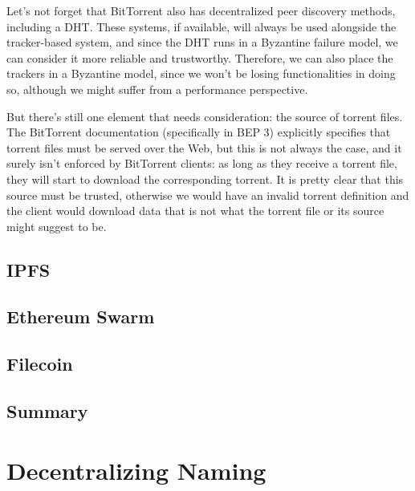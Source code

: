 \documentclass[mscthesis]{usiinfthesis}
\begin{document}
Let's not forget that BitTorrent also has decentralized peer discovery methods, including a DHT. These systems, if available, will always be used alongside the tracker-based system, and since the DHT runs in a Byzantine failure model, we can consider it more reliable and trustworthy. Therefore, we can also place the trackers in a Byzantine model, since we won't be losing functionalities in doing so, although we might suffer from a performance perspective.

But there's still one element that needs consideration: the source of torrent files. The BitTorrent documentation (specifically in BEP 3) explicitly specifies that torrent files must be served over the Web, but this is not always the case, and it surely isn't enforced by BitTorrent clients: as long as they receive a torrent file, they will start to download the corresponding torrent. It is pretty clear that this source must be trusted, otherwise we would have an invalid torrent definition and the client would download data that is not what the torrent file or its source might suggest to be.

\cite{Zghaibeh2008}

\section{IPFS}\label{proj:ipfs}

\section{Ethereum Swarm}\label{proj:swarm}

\section{Filecoin}\label{proj:filecoin}

\section{Summary}


\chapter{Decentralizing Naming}
\end{document}
